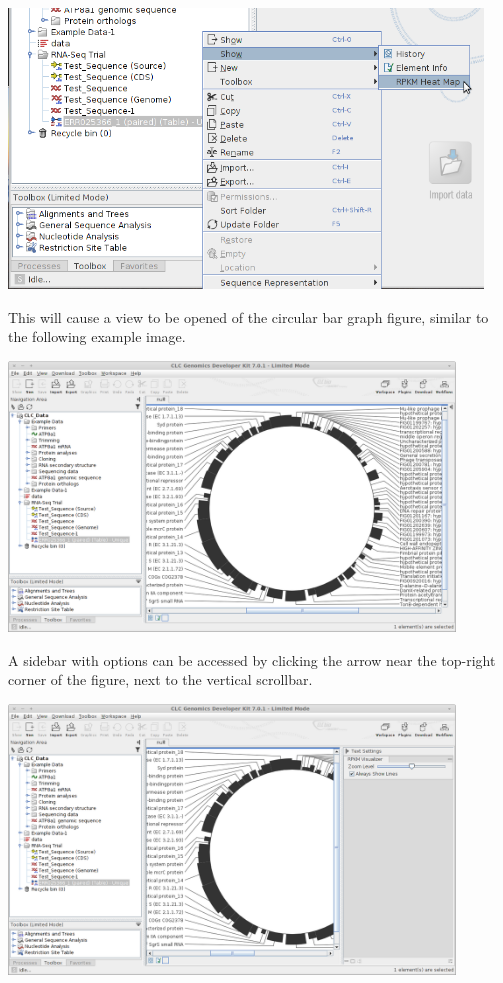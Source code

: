 \documentclass[12pt,letterpaper]{article}
\begin{document}
\begin{center}
    \includegraphics[width=34em]{access-plugin.png}
\end{center}

This will cause a view to be opened of the circular bar graph figure, similar
to the following example image.

\begin{center}
    \includegraphics[width=32em]{plugin-result.png}
\end{center}

A sidebar with options can be accessed by clicking the arrow near the top-right
corner of the figure, next to the vertical scrollbar.

\begin{center}
    \includegraphics[width=32em]{sidebar.png}
\end{center}
\end{document}
